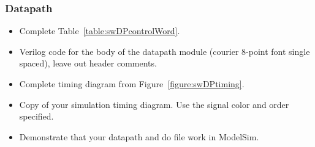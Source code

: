 \subsubsection{Datapath}

\begin{itemize}
\item
  Complete Table~\ref{table:swDPcontrolWord}.
\item
  Verilog code for the body of the datapath module (courier 8-point font
  single spaced), leave out header comments.
\item
 Complete timing diagram from Figure~\ref{figure:swDPtiming}.
\item
  Copy of your simulation timing diagram. Use the signal
  color and order specified.
\item
  Demonstrate that your datapath and do file work in ModelSim.
\end{itemize}

